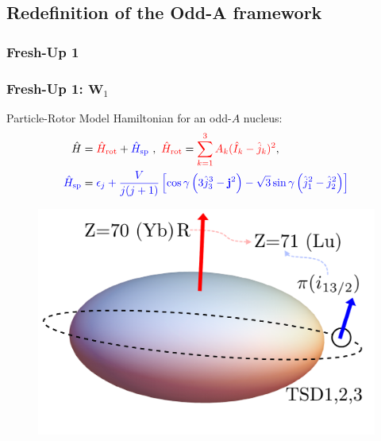 \documentclass{beamer}
\begin{document}
\subsection{Redefinition of the Odd-A framework}

\subsubsection{Fresh-Up 1}

\begin{frame}
	\frametitle{Fresh-Up 1: $\mathbf{W}_1$}
	Particle-Rotor Model Hamiltonian for an odd-$A$ nucleus:	
	\begin{alignat*}{2}
		\hat{H}&={\color{red}\hat{H}_\text{rot}}+{\color{blue}\hat{H}_\text{sp}}\ ,\ {\color{red}\hat{H}_\text{rot}}={\color{red}\sum_{k=1}^3A_k(\hat{I}_k-\hat{j}_k)^2},\\
		{\color{blue}\hat{H}_\text{sp}}&={\color{blue}\epsilon_j+\frac{V}{j(j+1)}\left[\cos\gamma\left(3\hat{j}_3^3-\mathbf{j}^2\right)-\sqrt{3}\sin\gamma\left(\hat{j}_1^2-\hat{j}_2^2\right)\right]}
	\end{alignat*}
	\vspace{-0.4cm}
	\begin{figure}
		\centering
		\includegraphics[scale=0.22]{figures/triaxial-shapes-oddA-1.pdf}

\end{figure}
\end{frame}
\end{document}
